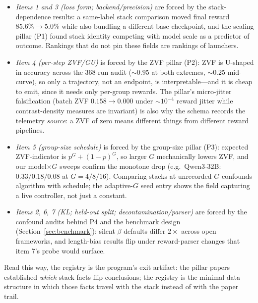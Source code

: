 \documentclass{article}
\providecommand{\secref}[1]{Section~\ref{#1}}
\begin{document}
\begin{itemize}[leftmargin=1.5em, itemsep=0.15em]
  \item \emph{Items 1 and 3 (loss form; backend/precision)} are forced by the
        stack-dependence results: a same-label stack comparison moved final reward
        $85.6\% \to 5.0\%$ while also bundling a different base checkpoint,
        and the scaling pillar (P1) found stack identity
        competing with model scale as a predictor of outcome. Rankings that do
        not pin these fields are rankings of launchers.
  \item \emph{Item 4 (per-step ZVF/GU)} is forced by the ZVF pillar (P2): ZVF
        is U-shaped in accuracy across the 368-run audit (${\sim}0.95$ at both
        extremes, ${\sim}0.25$ mid-curve), so only a trajectory, not an
        endpoint, is interpretable---and it is cheap to emit, since it needs
        only per-group rewards. The pillar's micro-jitter falsification
        (batch ZVF $0.158 \to 0.000$ under $\sim$$10^{-4}$ reward jitter while
        contrast-density measures are invariant) is also why the schema
        records the telemetry \emph{source}: a ZVF of zero means different
        things from different reward pipelines.
  \item \emph{Item 5 (group-size schedule)} is forced by the group-size pillar
        (P3): expected ZVF-indicator is $p^G + (1-p)^G$, so larger $G$
        mechanically lowers ZVF, and our model$\times G$ sweeps confirm the
        monotone drop (e.g.\ Qwen3-32B: $0.33/0.18/0.08$ at $G{=}4/8/16$).
        Comparing stacks at unrecorded $G$ confounds algorithm with schedule;
        the adaptive-$G$ seed entry shows the field capturing a live
        controller, not just a constant.
  \item \emph{Items 2, 6, 7 (KL; held-out split; decontamination/parser)} are
        forced by the confound audits behind P4 and the benchmark design
        (\secref{sec:benchmark}): silent $\beta$ defaults differ $2\times$
        across open frameworks, and length-bias results flip under
        reward-parser changes that item 7's probe would surface.
\end{itemize}

Read this way, the registry is the program's exit artifact: the pillar papers
established \emph{which} stack facts flip conclusions; the registry is the
minimal data structure in which those facts travel with the stack instead of
with the paper trail.
\end{document}
